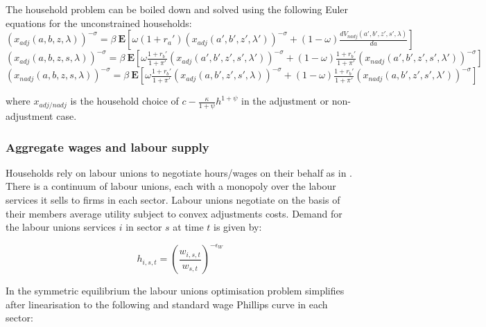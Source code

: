 \documentclass[12pt]{article}
\begin{document}
The household problem can be boiled down and solved using the following Euler equations for the unconstrained households: \\

$\left(x_{adj}(a,b,z,\lambda)\right)^{-\sigma}=\beta\ \mathbf{E} \left[ \omega (1+r_{a}') \left( x_{adj}(a',b',z',\lambda' ) \right)^{-\sigma}+(1-\omega)\frac{dV_{nadj}(a',b',z',s',\lambda)}{da} \right]$
\begin{equation}
\end{equation}
$\left(x_{adj}(a,b,z,s,\lambda)\right)^{-\sigma}=\beta\ \mathbf{E} \left[ \omega \frac{1+r_{b}'}{1+\pi'} \left( x_{adj}(a',b',z',s',\lambda') \right)^{-\sigma}+(1-\omega)\frac{1+r_{b}'}{1+\pi'}\left( x_{nadj}(a',b',z',s',\lambda') \right)^{-\sigma} \right]$
\begin{equation}
\end{equation}
$\left(x_{nadj}(a,b,z,s,\lambda)\right)^{-\sigma}=\beta\ \mathbf{E} \left[ \omega \frac{1+r_{b}'}{1+\pi'} \left( x_{adj}(a,b',z',s',\lambda) \right)^{-\sigma}+(1-\omega)\frac{1+r_{b}'}{1+\pi'}\left( x_{nadj}(a,b',z',s',\lambda') \right)^{-\sigma} \right]$
\begin{equation}
\end{equation}

where $x_{adj/nadj}$ is the household choice of $c-\frac{\kappa}{1+\psi}h^{1+\psi}$ in the adjustment or non-adjustment case.

\subsubsection{Aggregate wages and  labour supply} 

Households rely on labour unions to negotiate hours/wages on their behalf as in \cite{schmitt2005optimal}. There is a continuum of labour unions, each with a monopoly over the labour services it sells to firms in each sector. Labour unions negotiate on the basis of their members average utility subject to convex adjustments costs. Demand for the labour unions services $i$ in sector $s$ at time $t$ is given by:

\begin{equation}
    h_{i,s,t}=(\frac{w_{i,s,t}}{w_{s,t}})^{-\epsilon_{W}}
    \label{eq:union}
\end{equation}

In the symmetric equilibrium the labour unions optimisation problem simplifies after linearisation to the following and standard wage Phillips curve in each sector:
\end{document}
